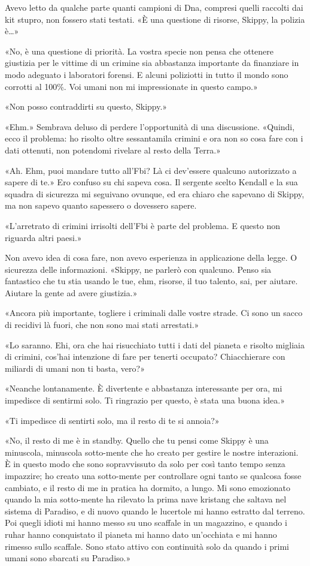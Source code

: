 Avevo letto da qualche parte quanti campioni di Dna, compresi quelli
raccolti dai kit stupro, non fossero stati testati. «È una questione di
risorse, Skippy, la polizia è\ldots»

«No, è una questione di priorità. La vostra specie non pensa che
ottenere giustizia per le vittime di un crimine sia abbastanza
importante da finanziare in modo adeguato i laboratori forensi. E alcuni
poliziotti in tutto il mondo sono corrotti al 100\%. Voi umani non mi
impressionate in questo campo.»

«Non posso contraddirti su questo, Skippy.»

«Ehm.» Sembrava deluso di perdere l'opportunità di una discussione.
«Quindi, ecco il problema: ho risolto oltre sessantamila crimini e ora
non so cosa fare con i dati ottenuti, non potendomi rivelare al resto
della Terra.»

«Ah. Ehm, puoi mandare tutto all'Fbi? Là ci dev'essere qualcuno
autorizzato a sapere di te.» Ero confuso su chi sapeva cosa. Il sergente
scelto Kendall e la sua squadra di sicurezza mi seguivano ovunque, ed
era chiaro che sapevano di Skippy, ma non sapevo quanto sapessero o
dovessero sapere.

«L'arretrato di crimini irrisolti dell'Fbi è parte del problema. E
questo non riguarda altri paesi.»

Non avevo idea di cosa fare, non avevo esperienza in applicazione della
legge. O sicurezza delle informazioni. «Skippy, ne parlerò con qualcuno.
Penso sia fantastico che tu stia usando le tue, ehm, risorse, il tuo
talento, sai, per aiutare. Aiutare la gente ad avere giustizia.»

«Ancora più importante, togliere i criminali dalle vostre strade. Ci
sono un sacco di recidivi là fuori, che non sono mai stati arrestati.»

«Lo saranno. Ehi, ora che hai risucchiato tutti i dati del pianeta e
risolto migliaia di crimini, cos'hai intenzione di fare per tenerti
occupato? Chiacchierare con miliardi di umani non ti basta, vero?»

«Neanche lontanamente. È divertente e abbastanza interessante per ora,
mi impedisce di sentirmi solo. Ti ringrazio per questo, è stata una
buona idea.»

«Ti impedisce di sentirti solo, ma il resto di te si annoia?»

«No, il resto di me è in standby. Quello che tu pensi come Skippy è una
minuscola, minuscola sotto-mente che ho creato per gestire le nostre
interazioni. È in questo modo che sono sopravvissuto da solo per così
tanto tempo senza impazzire; ho creato una sotto-mente per controllare
ogni tanto se qualcosa fosse cambiato, e il resto di me in pratica ha
dormito, a lungo. Mi sono emozionato quando la mia sotto-mente ha
rilevato la prima nave kristang che saltava nel sistema di Paradiso, e
di nuovo quando le lucertole mi hanno estratto dal terreno. Poi quegli
idioti mi hanno messo su uno scaffale in un magazzino, e quando i ruhar
hanno conquistato il pianeta mi hanno dato un'occhiata e mi hanno
rimesso sullo scaffale. Sono stato attivo con continuità solo da quando
i primi umani sono sbarcati su Paradiso.»

